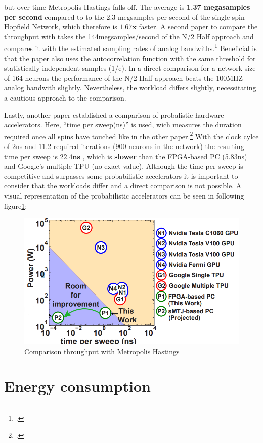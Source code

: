 but over time Metropolis Hastings falls off. The average is \textbf{1.37 megasamples per second} compared to to the 2.3
megsamples per second of the single spin Hopfield Network, which therefore is \(\mathbf{1.67x}\) faster.
A second paper to compare the throughput with takes the 144megsamples/second of the N/2 Half approach and compares it
with the estimated sampling rates of analog bandwiths.\footcite[cf.][7]{bohmNoiseinjectedAnalogIsing2022}
Beneficial is that the paper also uses the autocorrelation function with the same threshold for statistically independent samples (1/e).
In a direct comparison for a network size of 164 neurons the performance of the N/2 Half approach beats the 100MHZ analog bandwith slightly.
Nevertheless, the workload differs slightly, necessitating a cautious approach to the comparison.

Lastly, another paper established a comparison of probalistic hardware accelerators. Here, ``time per sweep(ns)'' is used, wich measures the duration required
once all spins have touched like in the other paper.\footcite[cf.][2]{aaditAcceleratingAdaptiveParallel2023}
With the clock cylce of 2ns and 11.2 required iterations (900 neurons in the network) the resulting time per sweep is \(\mathbf{22.4ns}\)
, which is \textbf{slower} than the \ac{FPGA}-based PC (5.83ns) and Google’s
multiple TPU (no exact value). 
Although the time per sweep is competitive and surpasses some probabilistic accelerators it is important to consider that the workloads differ and a direct comparison is not possible.
A visual representation of the probabilistic accelerators can be seen in following figure\ref{Comparison_throughput_literature_2}:
\begin{figure}[H]
    \centering
    \includegraphics[width=0.55\linewidth]{graphics/Troughput_comparison.png}
    \caption{Comparison throughput with Metropolis Hastings}
    \label{Comparison_throughput_literature_2}
\end{figure}

\section{Energy consumption}

